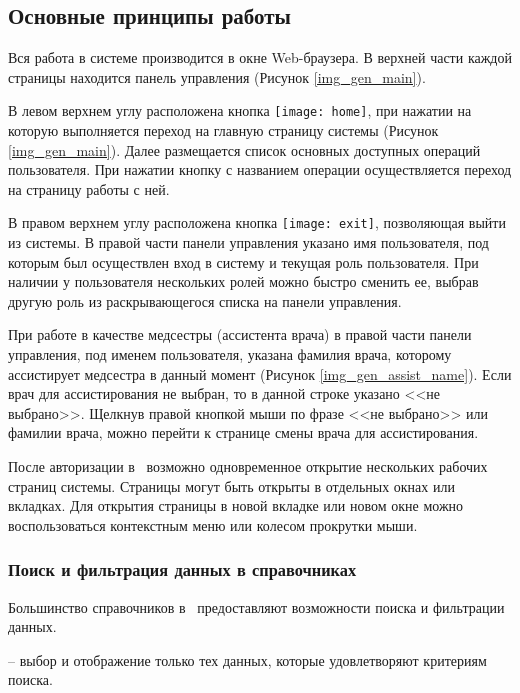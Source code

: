 \subsection{Основные принципы работы}

Вся работа в системе производится в окне Web-браузера. В верхней части каждой страницы находится панель управления (Рисунок \ref{img_gen_main}).

В левом верхнем углу расположена кнопка \texttt{[image: home]}, при нажатии на которую выполняется переход на главную страницу системы (Рисунок \ref{img_gen_main}). Далее размещается список основных доступных операций пользователя. При нажатии кнопку с названием операции осуществляется переход на страницу работы с ней. 

В правом верхнем углу расположена кнопка \texttt{[image: exit]}, позволяющая выйти из системы. В правой части панели управления указано имя пользователя, под которым был осуществлен вход в систему и текущая роль пользователя. При наличии у пользователя нескольких ролей можно быстро сменить ее, выбрав другую роль из раскрывающегося списка на панели управления. 

{
При работе в качестве медсестры (ассистента врача) в правой части панели управления, под именем пользователя, указана фамилия врача, которому ассистирует медсестра в данный момент (Рисунок \ref{img_gen_assist_name}). Если врач для ассистирования не выбран, то в данной строке указано <<не выбрано>>. Щелкнув правой кнопкой мыши по фразе <<не выбрано>> или фамилии врача, можно перейти к странице смены врача для ассистирования.
}{}

\begin{prim}
 После авторизации в \tmis~возможно одновременное открытие нескольких рабочих страниц системы. Страницы могут быть открыты в отдельных окнах или вкладках. Для открытия страницы в новой вкладке или новом окне можно воспользоваться контекстным меню или колесом прокрутки мыши.
\end{prim}

\subsubsection{Поиск и фильтрация данных в справочниках} \label{gen_filtr}

Большинство справочников в \tmis~предоставляют возможности поиска и фильтрации данных.

 -- выбор и отображение только тех данных, которые удовлетворяют критериям поиска.

